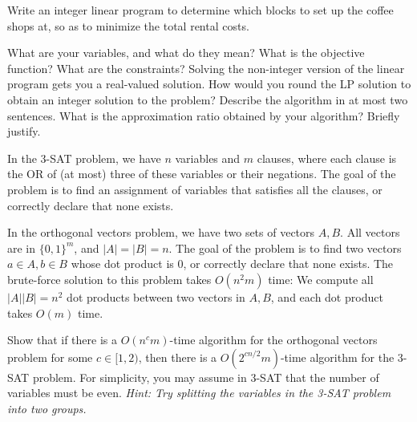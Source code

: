 \documentclass{article}
\begin{document}
Write an integer linear program to determine which blocks to set up the coffee shops at, so as to minimize the total rental costs.

\begin{subparts}
\subpart What are your variables, and what do they mean?
\subpart What is the objective function?
\subpart What are the constraints?
\subpart Solving the non-integer version of the linear program gets you a real-valued solution. How would you round the LP solution to obtain an integer solution to the problem?  Describe the algorithm in at most two sentences.
\subpart What is the approximation ratio obtained by your algorithm? Briefly justify.


\end{subparts}

In the 3-SAT problem, we have $n$ variables and $m$ clauses, where each clause is the OR of (at most) three of these variables or their negations. The goal of the problem is to find an assignment of variables that satisfies all the clauses, or correctly declare that none exists.

In the orthogonal vectors problem, we have two sets of vectors $A, B$. All vectors are in $\{0, 1\}^m$, and $|A|=|B|=n$. The goal of the problem is to find two vectors $a \in A, b \in B$ whose dot product is 0, or correctly declare that none exists. The brute-force solution to this problem takes $O(n^2 m)$ time: We compute all $|A||B| = n^2$ dot products between two vectors in $A, B$, and each dot product takes $O(m)$ time.

Show that if there is a $O(n^c m)$-time algorithm for the orthogonal vectors problem for some $c \in [1, 2)$, then there is a $O(2^{cn/2} m)$-time algorithm for the 3-SAT problem. For simplicity, you may assume in 3-SAT that the number of variables must be even. \textit{Hint: Try splitting the variables in the 3-SAT problem into two groups.}
\end{document}
